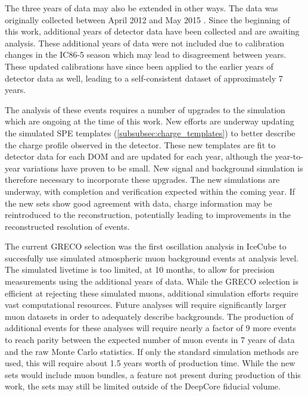 The three years of data may also be extended in other ways.
The data was originally collected between April 2012 and May 2015 .
Since the beginning of this work, additional years of detector data have been collected and are awaiting analysis.
These additional years of data were not included due to calibration changes in the IC86-5 season which may lead to disagreement between years.
These updated calibrations have since been applied to the earlier years of detector data as well, leading to a self-consistent dataset of approximately 7 years.

The analysis of these events requires a number of upgrades to the simulation which are ongoing at the time of this work.
New efforts are underway updating the simulated SPE templates (\ref{subsubsec:charge_templates}) to better describe the charge profile observed in the detector.
These new templates are fit to detector data for each DOM and are updated for each year, although the year-to-year variations have proven to be small.
New signal and background simulation is therefore necessary to incorporate these upgrades.
The new simulations are underway, with completion and verification expected within the coming year.
If the new sets show good agreement with data, charge information may be reintroduced to the reconstruction, potentially leading to improvements in the reconstructed resolution of events.

The current GRECO selection was the first oscillation analysis in IceCube to succesfully use simulated atmospheric muon background events at analysis level.
The simulated livetime is too limited, at 10 months, to allow for precision measurements using the additional years of data.
While the GRECO selection is efficient at rejecting these simulated muons, additional simulation efforts require vast computational resources.
Future analyses will require significantly larger muon datasets in order to adequately describe backgrounds.
The production of additional events for these analyses will require nearly a factor of 9 more events to reach parity between the expected number of muon events in 7 years of data and the raw Monte Carlo statistics.
If only the standard simulation methods are used, this will require about 1.5 years worth of production time.
While the new sets would include muon bundles, a feature not present during production of this work, the sets may still be limited outside of the DeepCore fiducial volume.

